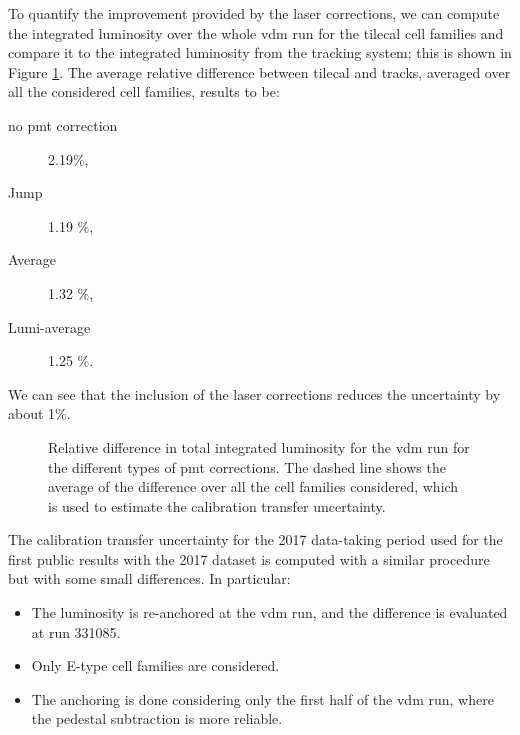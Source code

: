 To quantify the improvement provided by the laser corrections, we can compute the integrated luminosity over the whole 
\gls{vdm} run for the \gls{tilecal} cell families and compare it to the integrated luminosity from the tracking system; 
this is shown in Figure \ref{fig:apppmt:totallumi}. 
The average relative difference between \gls{tilecal} and tracks, averaged over all 
the considered cell families, results to be:
\begin{description}
\item[no \gls{pmt} correction] 2.19\%,
\item[Jump] 1.19 \%,
\item[Average] 1.32 \%,
\item[Lumi-average] 1.25 \%.
\end{description}

\noindent We can see that the inclusion of the laser corrections reduces the uncertainty by about 1\%.

\begin{figure}[htbp]
\centering
{}
\caption{Relative difference in total integrated luminosity for the \gls{vdm} run for the different types of 
\gls{pmt} corrections. The dashed line shows the average of the difference over all the cell families considered, which 
is used to estimate the calibration transfer uncertainty.}
\label{fig:apppmt:totallumi}
\end{figure}

The calibration transfer uncertainty for the 2017 data-taking period used for the first public results 
with the 2017 dataset 
is computed with a similar procedure but with some small differences.
In particular:
\begin{itemize}
\item The luminosity is re-anchored at the \gls{vdm} run, and the difference is evaluated at run 331085. 
\item Only E-type cell families are considered.
\item The anchoring is done considering only the first half of the \gls{vdm} run, where the 
pedestal subtraction is more reliable.
\end{itemize}

